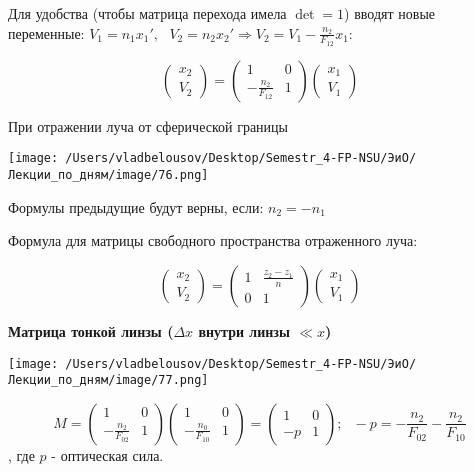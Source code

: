 \documentclass[12pt, a4paper]{report}
\begin{document}
Для удобства (чтобы матрица перехода имела \( \det =1 \)) вводят новые переменные: \( \displaystyle V_1 = n_1 x_1 ' , \text{ }  V_2 = n_2 x_2 '   \Rightarrow V_2 = V_1 - \frac{n_2 }{F_{12} } x_1  \):

\[ \begin{pmatrix}
x_2     \\
V_2
\end{pmatrix} = \begin{pmatrix}
1  & 0 \\
-\frac{n_2}{F_{12} }  & 1 
\end{pmatrix} \begin{pmatrix}
x_1     \\
V_1 
\end{pmatrix} \] 

При отражении луча от сферической границы

\begin{center}
    \texttt{[image: /Users/vladbelousov/Desktop/Semestr\_4-FP-NSU/ЭиО/Лекции\_по\_дням/image/76.png]}
\end{center} 

Формулы предыдущие будут верны, если: \(n_2 = -n_1   \) 

Формула для матрицы свободного пространства отраженного луча: 

\[ \begin{pmatrix}
x_2     \\
V_2
\end{pmatrix} = \begin{pmatrix}
1  & \frac{z_2 - z_1 }{n }  \\
0  & 1 
\end{pmatrix} \begin{pmatrix}
x_1     \\
V_1 
\end{pmatrix} \]

\textbf{Матрица тонкой линзы (\(  \Delta x\) внутри линзы \( \ll x \))} 

\begin{center}
    \texttt{[image: /Users/vladbelousov/Desktop/Semestr\_4-FP-NSU/ЭиО/Лекции\_по\_дням/image/77.png]}
\end{center} 

\[ M= \begin{pmatrix}
    1  & 0  \\
    - \frac{n_2}{F_{02}}   & 1 
    \end{pmatrix}
    \begin{pmatrix}
        1  & 0  \\
        - \frac{n_0}{F_{10}}   & 1 
    \end{pmatrix} = \begin{pmatrix}
        1  & 0  \\
       - p    & 1 
\end{pmatrix} ; \text{ }  -p = - \frac{n_2}{F_{02} } - \frac{n_2}{F_{10}}   \] 
, где \( p  \) - оптическая сила.
\end{document}
